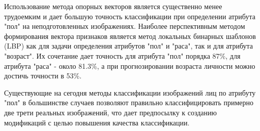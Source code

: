 \documentclass[12pt,a4paper]{article}
\begin{document}
Использование метода опорных векторов является существенно менее трудоемким и дает большую точность классификации при определении атрибута "пол" на неподготовленных изображениях. Наиболее перспективным методом формирования вектора признаков является метод локальных бинарных шаблонов (LBP) как для задачи определения
атрибутов "пол" и "раса", так и для атрибута "возраст". Их сочетание дает точность для атрибута "пол" порядка 87\%, для атрибута "раса" - около 81.3\%, а при прогнозировании возраста личности можно достичь точности в 53\%.

Существующие на сегодня методы классификации изображений лиц по атрибуту "пол" в большинстве случаев позволяют правильно классифицировать примерно две трети реальных изображений, что дает предпосылку к созданию модификаций с целью повышения качества классификации.
\end{document}
